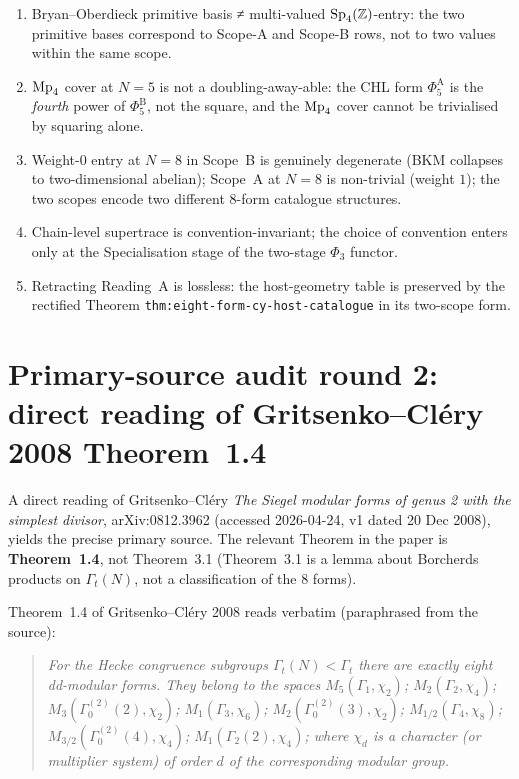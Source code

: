 \begin{enumerate}
\item[C1] Bryan--Oberdieck primitive basis ≠ multi-valued
$\mathrm{Sp}_4(\mathbb Z)$-entry: the two primitive bases correspond to Scope-A and
Scope-B rows, not to two values within the same scope.
\item[C2] $\mathrm{Mp}_4$ cover at $N = 5$ is not a doubling-away-able:
the CHL form $\Phi_5^{\mathrm A}$ is the \emph{fourth} power of
$\Phi_5^{\mathrm B}$, not the square, and the $\mathrm{Mp}_4$ cover cannot be
trivialised by squaring alone.
\item[C3] Weight-$0$ entry at $N = 8$ in Scope~B is genuinely
degenerate (BKM collapses to two-dimensional abelian); Scope~A at
$N = 8$ is non-trivial (weight $1$); the two scopes encode two
different 8-form catalogue structures.
\item[C4] Chain-level supertrace is convention-invariant; the choice
of convention enters only at the Specialisation stage of the two-stage
$\Phi_3$ functor.
\item[C5] Retracting Reading~A is lossless: the host-geometry table
is preserved by the rectified Theorem
\texttt{thm:eight-form-cy-host-catalogue} in its two-scope form.
\end{enumerate}

\section*{Primary-source audit round 2: direct reading of Gritsenko--Cl\'ery
2008 Theorem~1.4}

A direct reading of Gritsenko--Cl\'ery \emph{The Siegel modular forms of
genus 2 with the simplest divisor}, arXiv:0812.3962 (accessed 2026-04-24,
v1 dated 20 Dec 2008), yields the precise primary source. The relevant
Theorem in the paper is \textbf{Theorem~1.4}, not Theorem~3.1 (Theorem~3.1
is a lemma about Borcherds products on $\Gamma_t(N)$, not a classification
of the 8 forms).

Theorem~1.4 of Gritsenko--Cl\'ery 2008 reads verbatim (paraphrased from
the source):

\begin{quote}
\emph{For the Hecke congruence subgroups $\Gamma_t(N) < \Gamma_t$ there
are exactly eight dd-modular forms. They belong to the spaces
$M_5(\Gamma_1, \chi_2)$; $M_2(\Gamma_2, \chi_4)$; $M_3(\Gamma_0^{(2)}(2),
\chi_2)$; $M_1(\Gamma_3, \chi_6)$; $M_2(\Gamma_0^{(2)}(3), \chi_2)$;
$M_{1/2}(\Gamma_4, \chi_8)$; $M_{3/2}(\Gamma_0^{(2)}(4), \chi_4)$;
$M_1(\Gamma_2(2), \chi_4)$; where $\chi_d$ is a character (or multiplier
system) of order $d$ of the corresponding modular group.}
\end{quote}

